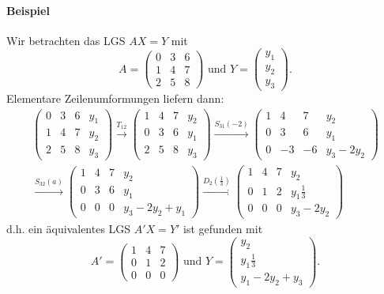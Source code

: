 \paragraph{Beispiel}
	Wir betrachten das LGS $ AX=Y $ mit 
	\[	A = \begin{pmatrix}
		0 & 3 & 6\\
		1 & 4 & 7\\
		2 & 5 & 8
		\end{pmatrix}
		\text{ und }
		Y = \begin{pmatrix}
		y_1 \\ y_2 \\ y_3
		\end{pmatrix}. \]
	Elementare Zeilenumformungen liefern dann:
	\begin{gather*}
	\begin{pmatrix}
		0 & 3 & 6 & y_1\\
		1 & 4 & 7 & y_2\\
		2 & 5 & 8 & y_3
	\end{pmatrix}
	\overset{T_{12}}{\to}
	\begin{pmatrix}	
		1 & 4 & 7 & y_2\\
		0 & 3 & 6 & y_1\\
		2 & 5 & 8 & y_3
	\end{pmatrix}
	\overset{S_{31}(-2)}{\to}
	\begin{pmatrix}	
		1 & 4 & 7 & y_2\\
		0 & 3 & 6 & y_1\\
		0 & -3 & -6 & y_3-2y_2
	\end{pmatrix}\\
	\overset{S_{32}(a)}{\to}
	\begin{pmatrix}	
		1 & 4 & 7 & y_2\\
		0 & 3 & 6 & y_1\\
		0 & 0 & 0 & y_3-2y_2+y_1
	\end{pmatrix}
	\overset{D_2(\frac{1}{3})}{\to}
	\begin{pmatrix}	
		1 & 4 & 7 & y_2\\
		0 & 1 & 2 & y_1 \frac{1}{3}\\
		0 & 0 & 0 & y_3-2y_2
	\end{pmatrix}
	 \end{gather*}
	 d.h. ein äquivalentes LGS $ A'X=Y' $ ist gefunden mit
	 	\[ A' = 
	 	\begin{pmatrix}	
	 		1 & 4 & 7 \\
	 		0 & 1 & 2 \\
	 		0 & 0 & 0 
	 	\end{pmatrix}
	 	\text{ und }
	 	Y = \begin{pmatrix}
	 	y_2 \\ y_1\frac{1}{3} \\ y_1-2y_2+y_3
	 	\end{pmatrix}.\]
